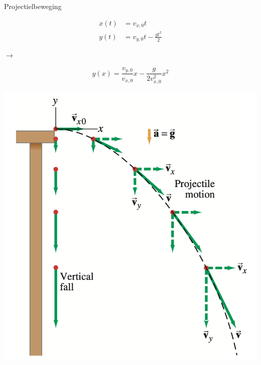 \begin{app}[Projectielbeweging]{Projectielbeweging}
\begin{minipage}{.66\textwidth}
        \hspace{-0.5cm}\begin{minipage}{.43\textwidth}
            \begin{align*}
                x(t) &= v_{x,0}t \\
                y(t) &= v_{y,0}t - \frac{gt^2}{2}
            \end{align*}
        \end{minipage} \hspace{-0.5cm}$\longrightarrow$
        \begin{minipage}{.43\textwidth}
            \vspace{-0.2cm}
            \begin{equation*}
                y(x) = \frac{v_{y,0}}{v_{x,0}}x - \frac{g}{2v_{x,0}^2}x^2
            \end{equation*}
        \end{minipage}
    \end{minipage}
    \hspace{-1cm}\begin{minipage}{.4\textwidth}
        \includegraphics[scale = 0.255]{Images/Kinematica/Projectielbeweging.png}
    \end{minipage}


\end{app}
